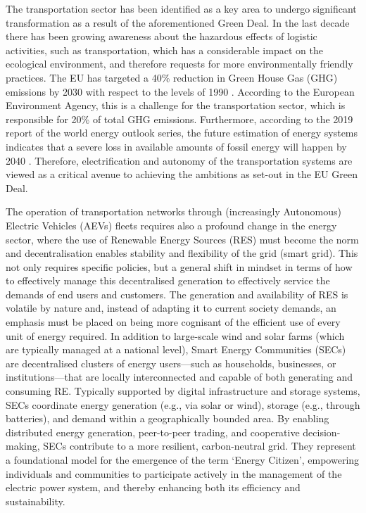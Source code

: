 The transportation sector has been identified as a key area to undergo significant
transformation as a result of the aforementioned Green Deal. In the last decade there has
been growing awareness about the hazardous effects of logistic activities, such as
transportation, which has a considerable impact on the ecological environment, and
therefore requests for more environmentally friendly practices. The EU has targeted a 40\%
reduction in Green House Gas (GHG) emissions by 2030 with respect to the levels of 1990
\cite{europeancommission2024promoting}. According to the European Environment Agency, this is a challenge for the transportation sector, which is responsible for 20\% of total GHG emissions. Furthermore, according to the 2019 report of the world energy outlook series, the future estimation of energy systems indicates that a severe loss in available amounts of fossil energy will happen by 2040 \cite{greendeal}. Therefore, electrification and autonomy of the transportation systems are viewed as a critical avenue to achieving the ambitions as set-out in the EU Green Deal.

The operation of transportation networks through (increasingly Autonomous) Electric
Vehicles (AEVs) fleets requires also a profound change in the energy sector, where the use
of Renewable Energy Sources (RES) must become the norm \cite{alfaseeh2019multi} \cite{baudru2024comparative} and decentralisation enables stability and flexibility of the grid (smart grid). This not only requires specific policies, but a general shift in mindset in terms of how to effectively manage this decentralised generation to effectively service the demands of end users and customers. The generation and availability of RES is volatile by nature and, instead of adapting it to current society demands, an emphasis must be placed on being more cognisant of the efficient use of every unit of energy required. In addition to large-scale wind and solar farms (which are typically managed at a national level), Smart Energy Communities (SECs) are decentralised clusters of energy users—such as households, businesses, or institutions—that are locally interconnected and capable of both generating and consuming RE. Typically supported by digital infrastructure and storage systems, SECs coordinate energy generation (e.g., via solar or wind), storage (e.g., through batteries), and demand within a geographically bounded area. By enabling distributed energy generation, peer-to-peer trading, and cooperative decision-making, SECs contribute to a more resilient, carbon-neutral grid. They represent a foundational model for the emergence of the term ‘Energy Citizen’, empowering individuals and communities to participate actively in the management of the electric power system, and thereby enhancing both its efficiency and sustainability.

